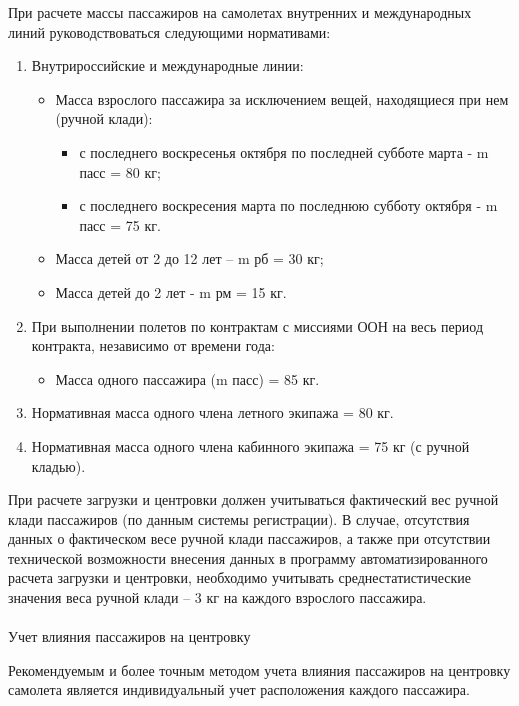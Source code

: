 При расчете массы пассажиров на самолетах внутренних и международных линий руководствоваться следующими нормативами:
\begin{enumerate}
    \item Внутрироссийские и международные линии:
    \begin{itemize}
        \item Масса взрослого пассажира за исключением вещей, находящиеся при нем (ручной клади):
        \begin{itemize}
            \item с последнего воскресенья октября по последней субботе марта - m пасс = 80 кг;
            \item с последнего воскресения марта по последнюю субботу октября - m пасс = 75 кг.
        \end{itemize}
        \item Масса детей от 2 до 12 лет – m рб = 30 кг;
        \item Масса детей до 2 лет - m рм = 15 кг.
    \end{itemize}
    \item При выполнении полетов по контрактам с миссиями ООН на весь период контракта, независимо от времени года:
    \begin{itemize}
        \item Масса одного пассажира (m пасс) = 85 кг.	
    \end{itemize}
    \item Нормативная масса одного члена летного экипажа = 80 кг.
    \item Нормативная масса одного члена кабинного экипажа = 75 кг (с ручной кладью).
\end{enumerate}
  
При расчете загрузки и центровки должен учитываться фактический вес ручной клади пассажиров (по данным системы регистрации).
В случае, отсутствия данных о фактическом весе ручной клади пассажиров, а также при отсутствии технической возможности внесения данных в программу автоматизированного расчета загрузки и центровки, необходимо учитывать среднестатистические значения веса ручной клади – 3 кг на каждого взрослого пассажира. 

\paragraph{} Учет влияния пассажиров на центровку 

Рекомендуемым и более точным методом учета влияния пассажиров на центровку самолета является индивидуальный учет расположения каждого пассажира. 

